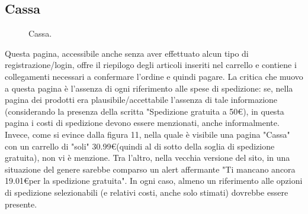 \subsection{Cassa}
\begin{figure}[!htb]
	\caption{\label{fig:figura11}} Cassa.
\end{figure}
Questa pagina, accessibile anche senza aver effettuato alcun tipo di registrazione/login, offre il riepilogo degli articoli inseriti nel carrello e contiene i collegamenti necessari a confermare l'ordine e quindi pagare. La critica che muovo a questa pagina è l'assenza di ogni riferimento alle spese di spedizione: se, nella pagina dei prodotti era plausibile/accettabile l'assenza di tale informazione (considerando la presenza della scritta "Spedizione gratuita a 50\euro), in questa pagina i costi di spedizione devono essere menzionati, anche informalmente. Invece, come si evince dalla figura 11, nella quale è visibile una pagina "Cassa" con un carrello di "soli" 30.99\euro (quindi al di sotto della soglia di spedizione gratuita), non vi è menzione. Tra l'altro, nella vecchia versione del sito, in una situazione del genere sarebbe comparso un alert affermante "Ti mancano ancora 19.01\euro per la spedizione gratuita". In ogni caso, almeno un riferimento alle opzioni di spedizione selezionabili (e relativi costi, anche solo stimati) dovrebbe essere presente.

\pagebreak
